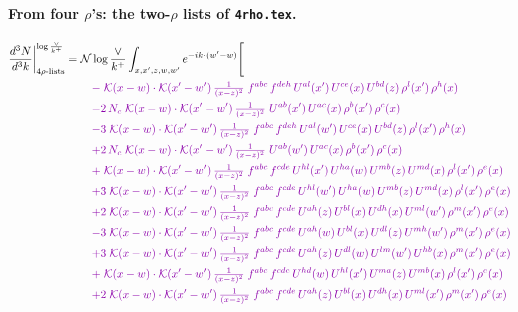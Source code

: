 \documentclass[10pt]{article}
\numberwithin{equation}{section}
\newcommand{\NNv}{\mathcal N\log\frac{\vee}{k^+}}
\begin{document}
\paragraph{From four $\rho$'s: the two-$\rho$ lists of \texttt{4rho.tex}.}
\begin{align}
\frac{d^3N}{d^3k}\bigg|^{\log\frac{\vee}{k^+}}_{4\rho\text{-lists}}={}&\NNv\int_{x,x',z,w,w'}e^{-ik\cdot(w'-w)}\Bigg[\notag\\
&\quad{\color{CC}-\;\mathcal{K}(x-w)\cdot\mathcal{K}(x'-w')\,\tfrac{1}{(x-z)^{2}}\;f^{abc}\,f^{deh}\,U^{al}(x')\,U^{ce}(x)\,U^{bd}(z)\,\rho^{l}(x')\,\rho^{h}(x)}\notag\\
&\quad{\color{CC}-2\,N_c\;\mathcal{K}(x-w)\cdot\mathcal{K}(x'-w')\,\tfrac{1}{(x-z)^{2}}\;U^{ab}(x')\,U^{ac}(x)\,\rho^{b}(x')\,\rho^{c}(x)}\notag\\
&\quad{\color{CC}-3\;\mathcal{K}(x-w)\cdot\mathcal{K}(x'-w')\,\tfrac{1}{(x-z)^{2}}\;f^{abc}\,f^{deh}\,U^{al}(w')\,U^{ce}(x)\,U^{bd}(z)\,\rho^{l}(x')\,\rho^{h}(x)}\notag\\
&\quad{\color{CC}+2\,N_c\;\mathcal{K}(x-w)\cdot\mathcal{K}(x'-w')\,\tfrac{1}{(x-z)^{2}}\;U^{ab}(w')\,U^{ac}(x)\,\rho^{b}(x')\,\rho^{c}(x)}\notag\\
&\quad{\color{CC}+\;\mathcal{K}(x-w)\cdot\mathcal{K}(x'-w')\,\tfrac{1}{(x-z)^{2}}\;f^{abc}\,f^{cde}\,U^{hl}(x')\,U^{ha}(w)\,U^{mb}(z)\,U^{md}(x)\,\rho^{l}(x')\,\rho^{e}(x)}\notag\\
&\quad{\color{CC}+3\;\mathcal{K}(x-w)\cdot\mathcal{K}(x'-w')\,\tfrac{1}{(x-z)^{2}}\;f^{abc}\,f^{cde}\,U^{hl}(w')\,U^{ha}(w)\,U^{mb}(z)\,U^{md}(x)\,\rho^{l}(x')\,\rho^{e}(x)}\notag\\
&\quad{\color{CC}+2\;\mathcal{K}(x-w)\cdot\mathcal{K}(x'-w')\,\tfrac{1}{(x-z)^{2}}\;f^{abc}\,f^{cde}\,U^{ah}(z)\,U^{bl}(x)\,U^{dh}(x)\,U^{ml}(w')\,\rho^{m}(x')\,\rho^{e}(x)}\notag\\
&\quad{\color{CC}-3\;\mathcal{K}(x-w)\cdot\mathcal{K}(x'-w')\,\tfrac{1}{(x-z)^{2}}\;f^{abc}\,f^{cde}\,U^{ah}(w)\,U^{bl}(x)\,U^{dl}(z)\,U^{mh}(w')\,\rho^{m}(x')\,\rho^{e}(x)}\notag\\
&\quad{\color{CC}+3\;\mathcal{K}(x-w)\cdot\mathcal{K}(x'-w')\,\tfrac{1}{(x-z)^{2}}\;f^{abc}\,f^{cde}\,U^{ah}(z)\,U^{dl}(w)\,U^{lm}(w')\,U^{hb}(x)\,\rho^{m}(x')\,\rho^{e}(x)}\notag\\
&\quad{\color{CC}+\;\mathcal{K}(x-w)\cdot\mathcal{K}(x'-w')\,\tfrac{1}{(x-z)^{2}}\;f^{abc}\,f^{cde}\,U^{hd}(w)\,U^{hl}(x')\,U^{ma}(z)\,U^{mb}(x)\,\rho^{l}(x')\,\rho^{e}(x)}\notag\\
&\quad{\color{CC}+2\;\mathcal{K}(x-w)\cdot\mathcal{K}(x'-w')\,\tfrac{1}{(x-z)^{2}}\;f^{abc}\,f^{cde}\,U^{ah}(z)\,U^{bl}(x)\,U^{dh}(x)\,U^{ml}(x')\,\rho^{m}(x')\,\rho^{e}(x)}\notag\\

\end{align}
\end{document}
